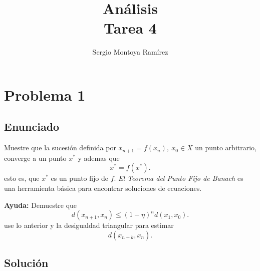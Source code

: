 \documentclass{report}
\title{\Huge{Análisis}\\Tarea 4}
\author{\huge{Sergio Montoya Ramírez}}
\date{}
\begin{document}
\maketitle
\newpage%
\tableofcontents
\pagebreak

\chapter{Problema 1}\label{ch:1}
\section{Enunciado}


Muestre que la sucesión definida por $x_{n + 1} = f\left( x_n \right) ,\ x_0 \in X$ un punto arbitrario, converge a un punto $x^{*}$ y ademas que \[
x^{*} = f\left( x^{*} \right) 
.\] esto es, que $x^{*}$ es un punto fijo de $f$. \textit{El Teorema del Punto Fijo de Banach} es una herramienta básica para encontrar soluciones de ecuaciones.

\textbf{Ayuda:} Demuestre que \[
d\left( x_{n+1}, x_{n} \right) \le \left( 1 - \eta \right)^{n}d\left( x_1, x_0 \right) 
.\] use lo anterior y la desigualdad triangular para estimar \[
d\left( x_{n + k}, x_n \right) 
.\] 

\section{Solución}
\end{document}
